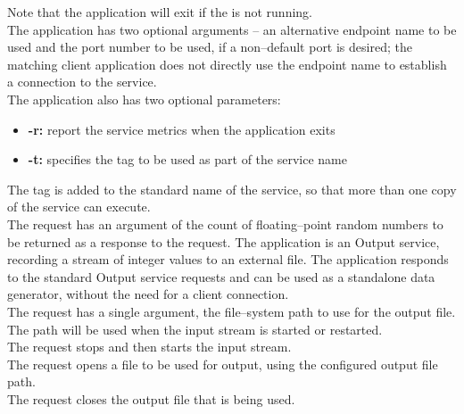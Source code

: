 Note that the application will exit if the
 is not running.\\

The application has two optional arguments -- an alternative endpoint name to be used and
the port number to be used, if a non--default port is desired; the matching client
application does not directly use the endpoint name to establish a connection to the
service.\\

The application also has two optional parameters:
\begin{itemize}
\item \textbf{-r:} report the service metrics when the application exits
\item \textbf{-t:} specifies the tag to be used as part of the service name
\end{itemize}
The tag is added to the standard name of the service, so that more than one copy of the
service can execute.\\

The  request has an argument of the
count of floating--point random numbers to be returned as a response to the request.
%
The  application is an Output
service, recording a stream of integer values to an external file.
The application responds to the standard Output service requests and can be used as a
standalone data generator, without the need for a client connection.\\

The  request has a single argument,
the file--system path to use for the output file.
The path will be used when the input stream is started or restarted.\\

The  request stops and then
starts the input stream.\\

The  request opens a file to be
used for output, using the configured output file path.\\

The  request closes the output
file that is being used.\\

